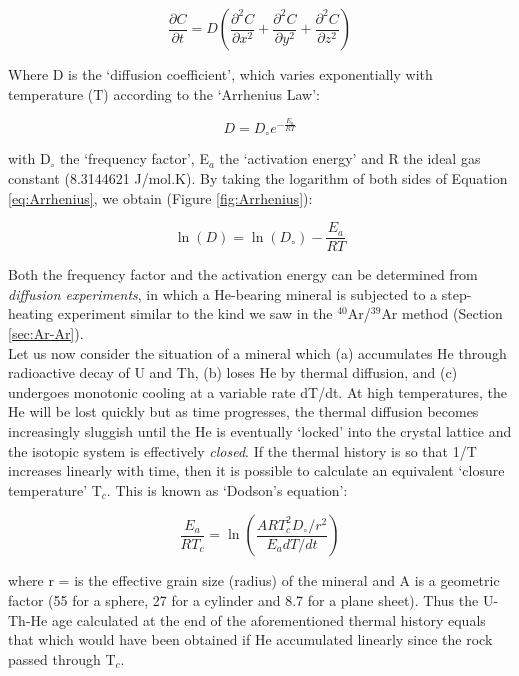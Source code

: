 \documentclass{book}
\begin{document}
\begin{equation}
\frac{\partial C}{\partial t} = D \left(
\frac{\partial^2C}{\partial x^2} + \frac{\partial^2C}{\partial y^2} +
\frac{\partial^2C}{\partial z^2}\right)
\label{eq:fick}
\end{equation}

Where D is the `diffusion coefficient', which varies exponentially
with temperature (T) according to the `Arrhenius Law':

\begin{equation}
D = D_\circ e^{-\frac{E_a}{RT}}
\label{eq:Arrhenius}
\end{equation}

with D$_\circ$ the `frequency factor', E$_a$ the `activation energy'
and R the ideal gas constant (8.3144621 J/mol.K). By taking the
logarithm of both sides of Equation \ref{eq:Arrhenius}, we obtain
(Figure \ref{fig:Arrhenius}):

\begin{equation}
\ln(D) = \ln(D_\circ) - \frac{E_a}{RT}
\label{eq:logD}
\end{equation}

Both the frequency factor and the activation energy can be determined
from \emph{diffusion experiments}, in which a He-bearing mineral is
subjected to a step-heating experiment similar to the kind we saw in
the $^{40}$Ar/$^{39}$Ar method (Section \ref{sec:Ar-Ar}).\\

Let us now consider the situation of a mineral which (a) accumulates
He through radioactive decay of U and Th, (b) loses He by thermal
diffusion, and (c) undergoes monotonic cooling at a variable rate
dT/dt. At high temperatures, the He will be lost quickly but as time
progresses, the thermal diffusion becomes increasingly sluggish until
the He is eventually `locked' into the crystal lattice and the isotopic
system is effectively \emph{closed}. If the thermal history is so that
1/T increases linearly with time, then it is possible to calculate an
equivalent `closure temperature' T$_c$. This is known as `Dodson's
equation':

\begin{equation}
\frac{E_a}{RT_c} = \ln\left(\frac{ART_c^2D_\circ/r^2}{E_adT/dt}\right)
\label{eq:Tc}
\end{equation}

where r = is the effective grain size (radius) of the mineral and A is
a geometric factor (55 for a sphere, 27 for a cylinder and 8.7 for a
plane sheet). Thus the U-Th-He age calculated at the end of the
aforementioned thermal history equals that which would have been
obtained if He accumulated linearly since the rock passed through
T$_c$.\\
\end{document}
